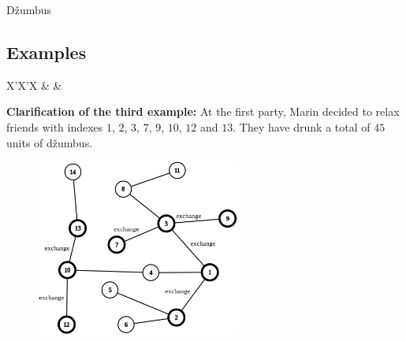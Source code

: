 \begin{statement}[
  problempoints=110,
  timelimit=1 sekunda,
  memorylimit=512 MiB,
]{Džumbus}
\subsection*{Examples}
\begin{tabularx}{\textwidth}{X'X'X}
 &
 &
\end{tabularx}

\textbf{Clarification of the third example:}
At the first party, Marin decided to relax friends with indexes
$1$, $2$, $3$, $7$, $9$, $10$, $12$ and $13$. They have drunk a total
of $45$ units of džumbus.

\setlength\intextsep{-0.5cm}
\begin{figure}
\centering
\includegraphics[width=0.6\textwidth]{img/treeEnglish.png}
\end{figure}

\end{statement}

